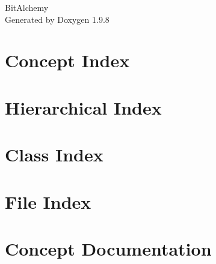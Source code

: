 \documentclass[twoside]{book}
\newcommand{\+}{\discretionary{\mbox{\scriptsize$\hookleftarrow$}}{}{}}
\newcommand{\clearemptydoublepage}{%
    \newpage{\pagestyle{empty}\cleardoublepage}%
  }
\begin{document}
  \raggedbottom
    \hypersetup{pageanchor=false,
                bookmarksnumbered=true,
                pdfencoding=unicode
               }
  \begin{titlepage}
  \vspace*{7cm}
  \begin{center}%
  {\Large Bit\+Alchemy}\\
  \vspace*{1cm}
  {\large Generated by Doxygen 1.9.8}\\
  \end{center}
  \end{titlepage}
  \clearemptydoublepage
  \tableofcontents
  \clearemptydoublepage
  \hypersetup{pageanchor=true}
\chapter{Concept Index}

\chapter{Hierarchical Index}

\chapter{Class Index}

\chapter{File Index}

\chapter{Concept Documentation}






\end{document}
